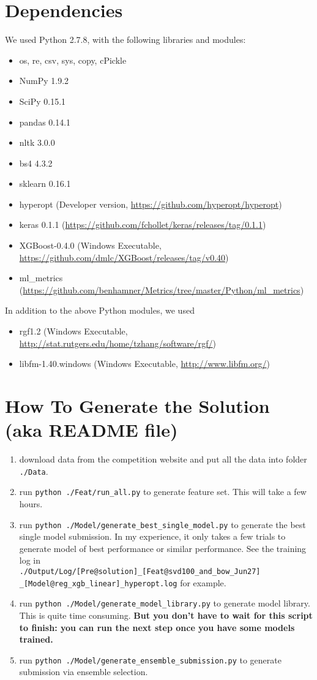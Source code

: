 \documentclass[12pt]{article}
\begin{document}
\section{Dependencies}
We used Python 2.7.8, with the following libraries and modules:
\begin{itemize}
\item os, re, csv, sys, copy, cPickle
\item NumPy 1.9.2
\item SciPy 0.15.1
\item pandas 0.14.1
\item nltk 3.0.0
\item bs4 4.3.2
\item sklearn 0.16.1
\item hyperopt (Developer version, \url{https://github.com/hyperopt/hyperopt})
\item keras 0.1.1 (\url{https://github.com/fchollet/keras/releases/tag/0.1.1})
\item XGBoost-0.4.0 (Windows Executable, \url{https://github.com/dmlc/XGBoost/releases/tag/v0.40})
\item ml\_metrics (\url{https://github.com/benhamner/Metrics/tree/master/Python/ml_metrics})
\end{itemize}
In addition to the above Python modules, we used
\begin{itemize}
\item rgf1.2 (Windows Executable, \url{http://stat.rutgers.edu/home/tzhang/software/rgf/})
\item libfm-1.40.windows (Windows Executable, \url{http://www.libfm.org/})
\end{itemize}

\section{How To Generate the Solution (aka README file)}
\begin{enumerate}
\item download data from the competition website and put all the data into folder \texttt{./Data}.
\item run \texttt{python ./Feat/run\_all.py} to generate feature set. This will take a few hours.
\item run \texttt{python ./Model/generate\_best\_single\_model.py} to generate the best single model submission. In my experience, it only takes a few trials to generate model of best performance or similar performance. See the training log in \\ \texttt{./Output/Log/[Pre@solution]\_[Feat@svd100\_and\_bow\_Jun27]\\
    \_[Model@reg\_xgb\_linear]\_hyperopt.log} for example.
\item run \texttt{python ./Model/generate\_model\_library.py} to generate model library. This is quite time consuming. \textbf{But you don't have to wait for this script to finish: you can run the next step once you have some models trained.}
\item run \texttt{python ./Model/generate\_ensemble\_submission.py} to generate submission via ensemble selection.
\end{enumerate}
\end{document}
